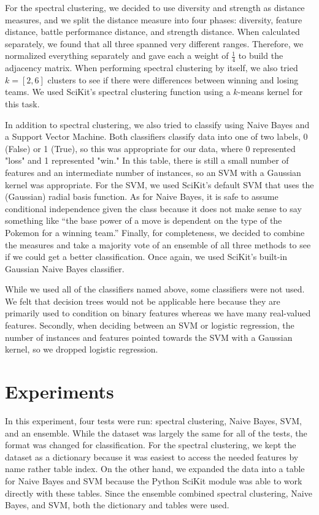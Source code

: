 \documentclass{acm_proc_article-sp}
\begin{document}
For the spectral clustering, we decided to use diversity and strength as distance measures, and we split the distance measure into four phases: diversity, feature distance, battle performance distance, and strength distance. When calculated separately, we found that all three spanned very different ranges. Therefore, we normalized everything separately and gave each a weight of $\frac{1}{4}$ to build the adjacency matrix. When performing spectral clustering by itself, we also tried $k=[2, 6]$ clusters to see if there were differences between winning and losing teams. We used SciKit's spectral clustering function using a $k$-means kernel for this task.

In addition to spectral clustering, we also tried to classify using Naive Bayes and a Support Vector Machine. Both classifiers classify data into one of two labels, 0 (False) or 1 (True), so this was appropriate for our data, where 0 represented "loss" and 1 represented "win." In this table, there is still a small number of features and an intermediate number of instances, so an SVM with a Gaussian kernel was appropriate. For the SVM, we used SciKit's default SVM that uses the (Gaussian) radial basis function. As for Naive Bayes, it is safe to assume conditional independence given the class because it does not make sense to say something like “the base power of a move is dependent on the type of the Pokemon for a winning team.” Finally, for completeness, we decided to combine the measures and take a majority vote of an ensemble of all three methods to see if we could get a better classification. Once again, we used SciKit's built-in Gaussian Naive Bayes classifier.

While we used all of the classifiers named above, some classifiers were not used. We felt that decision trees would not be applicable here because they are primarily used to condition on binary features whereas we have many real-valued features. Secondly, when deciding between an SVM or logistic regression, the number of instances and features pointed towards the SVM with a Gaussian kernel, so we dropped logistic regression.

\section{Experiments}

In this experiment, four tests were run: spectral clustering, Naive Bayes, SVM, and an ensemble. While the dataset was largely the same for all of the tests, the format was changed for classification. For the spectral clustering, we kept the dataset as a dictionary because it was easiest to access the needed features by name rather table index. On the other hand, we expanded the data into a table for Naive Bayes and SVM because the Python SciKit module was able to work directly with these tables. Since the ensemble combined spectral clustering, Naive Bayes, and SVM, both the dictionary and tables were used.
\end{document}
